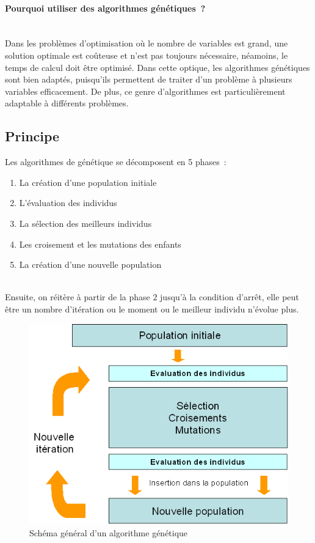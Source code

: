 \documentclass{article}
\begin{document}
    \paragraph{Pourquoi utiliser des algorithmes génétiques ?}\mbox{}\\
	Dans les problèmes d'optimisation où le nombre de variables est grand, une solution optimale est coûteuse et n'est pas toujours nécessaire, néamoins, le temps de calcul doit être optimisé. Dans cette optique, les algorithmes génétiques sont bien adaptés, puisqu'ils permettent de traiter d'un problème à plusieurs variables efficacement.
	De plus, ce genre d'algorithmes est particulièrement adaptable à différents problèmes.

	\subsection{Principe}
	Les algorithmes de génétique se décomposent en 5 phases :
	\begin{enumerate}
	\item La création d'une population initiale
	\item L'évaluation des individus
	\item La sélection des meilleurs individus
	\item Les croisement et les mutations des enfants
	\item La création d'une nouvelle population
	\end{enumerate}
    \mbox{}\\
    Ensuite, on réitère à partir de la phase $2$ jusqu'à la condition d'arrêt, elle peut être un nombre d'itération ou le moment ou le meilleur individu n'évolue plus.

	\begin{figure}
		\begin{center}
			\includegraphics[scale=0.5]{schema_gen.png}
		\end{center}

		\caption{Schéma général d'un algorithme génétique}

		\label{Schéma général d'un algorithme génétique}
	\end{figure}
\end{document}
